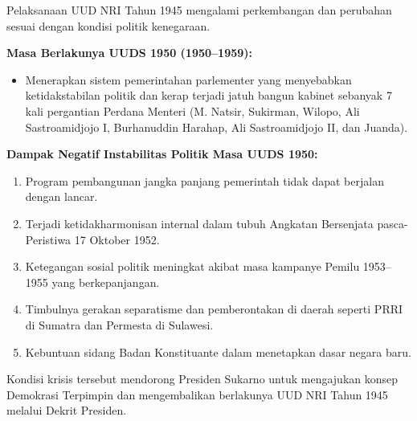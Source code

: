 Pelaksanaan UUD NRI Tahun 1945 mengalami perkembangan dan perubahan sesuai dengan kondisi politik kenegaraan.

\textbf{Masa Berlakunya UUDS 1950 (1950--1959):}
\begin{itemize}
\item Menerapkan sistem pemerintahan parlementer yang menyebabkan ketidakstabilan politik dan kerap terjadi jatuh bangun kabinet sebanyak 7 kali pergantian Perdana Menteri (M. Natsir, Sukirman, Wilopo, Ali Sastroamidjojo I, Burhanuddin Harahap, Ali Sastroamidjojo II, dan Juanda).
\end{itemize}

\textbf{Dampak Negatif Instabilitas Politik Masa UUDS 1950:}
\begin{enumerate}
\item Program pembangunan jangka panjang pemerintah tidak dapat berjalan dengan lancar.
\item Terjadi ketidakharmonisan internal dalam tubuh Angkatan Bersenjata pasca-Peristiwa 17 Oktober 1952.
\item Ketegangan sosial politik meningkat akibat masa kampanye Pemilu 1953--1955 yang berkepanjangan.
\item Timbulnya gerakan separatisme dan pemberontakan di daerah seperti PRRI di Sumatra dan Permesta di Sulawesi.
\item Kebuntuan sidang Badan Konstituante dalam menetapkan dasar negara baru.
\end{enumerate}

Kondisi krisis tersebut mendorong Presiden Sukarno untuk mengajukan konsep Demokrasi Terpimpin dan mengembalikan berlakunya UUD NRI Tahun 1945 melalui Dekrit Presiden.
